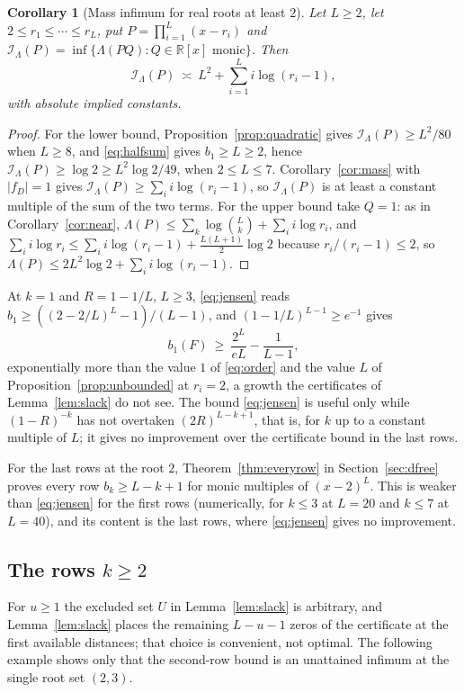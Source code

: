 \documentclass[11pt]{article}
\newtheorem{corollary}[theorem]{Corollary}
\newcommand{\R}{\mathbb R}
\begin{document}
\begin{corollary}[Mass infimum for real roots at least $2$]\label{cor:allroots}
Let $L\ge2$, let $2\le r_1\le\cdots\le r_L$, put $P=\prod_{i=1}^L(x-r_i)$ and
$\mathcal I_\Lambda(P)=\inf\{\Lambda(PQ):Q\in\R[x]\text{ monic}\}$.  Then
\[
  \mathcal I_\Lambda(P)\ \asymp\ L^2+\sum_{i=1}^Li\log(r_i-1),
\]
with absolute implied constants.
\end{corollary}

\begin{proof}
For the lower bound, Proposition~\ref{prop:quadratic} gives
$\mathcal I_\Lambda(P)\ge L^2/80$ when $L\ge8$, and \eqref{eq:halfsum}
gives $b_1\ge L\ge2$, hence
$\mathcal I_\Lambda(P)\ge\log2\ge L^2\log2/49$, when $2\le L\le7$.
Corollary~\ref{cor:mass} with $|f_D|=1$ gives
$\mathcal I_\Lambda(P)\ge\sum_ii\log(r_i-1)$, so
$\mathcal I_\Lambda(P)$ is at least a constant multiple of
the sum of the two terms.
For the upper bound take $Q=1$: as in Corollary~\ref{cor:near},
$\Lambda(P)\le\sum_k\log\binom Lk+\sum_ii\log r_i$, and
$\sum_ii\log r_i\le\sum_ii\log(r_i-1)+\tfrac{L(L+1)}2\log2$ because
$r_i/(r_i-1)\le2$, so
$\Lambda(P)\le2L^2\log2+\sum_ii\log(r_i-1)$.
\end{proof}

At $k=1$ and $R=1-1/L$, $L\ge3$, \eqref{eq:jensen} reads
$b_1\ge((2-2/L)^L-1)/(L-1)$, and $(1-1/L)^{L-1}\ge e^{-1}$ gives
\[
  b_1(F)\ \ge\ \frac{2^L}{eL}-\frac1{L-1},
\]
exponentially more than the value $1$ of \eqref{eq:order} and the value $L$
of Proposition~\ref{prop:unbounded} at $r_i=2$, a growth the
certificates of Lemma~\ref{lem:slack} do not see.  The bound
\eqref{eq:jensen} is useful only while $(1-R)^{-k}$ has not overtaken
$(2R)^{L-k+1}$, that is, for $k$ up to a constant multiple of $L$; it gives
no improvement over the certificate bound in the last rows.

For the last rows at the root $2$, Theorem~\ref{thm:everyrow} in
Section~\ref{sec:dfree} proves every row $b_k\ge L-k+1$ for monic multiples of
$(x-2)^L$.  This is weaker than \eqref{eq:jensen} for the first rows
(numerically, for $k\le3$ at $L=20$ and $k\le7$ at $L=40$), and its
content is the last rows, where \eqref{eq:jensen} gives no improvement.

\subsection{The rows \texorpdfstring{$k\ge2$}{k at least 2}}

For $u\ge1$ the excluded set $U$ in Lemma~\ref{lem:slack} is arbitrary, and
Lemma~\ref{lem:slack} places the remaining $L-u-1$ zeros of the certificate
at the first available distances; that choice is convenient, not optimal.
The following example shows only that the second-row bound is an unattained
infimum at the single root set $(2,3)$.
\end{document}
